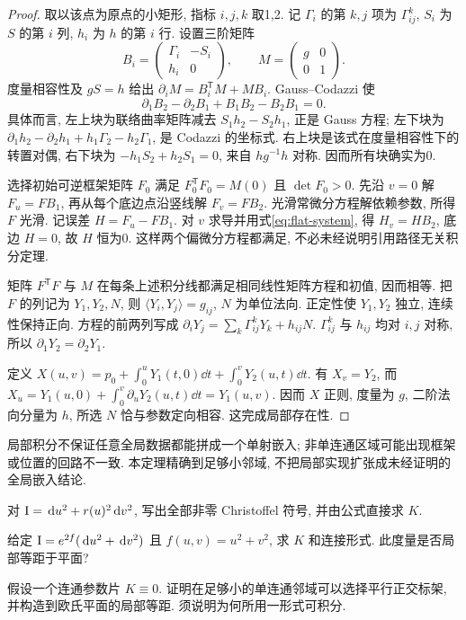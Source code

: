 \begin{proof}
取以该点为原点的小矩形, 指标 $i,j,k$ 取1,2. 记 $\Gamma_i$ 的第 $k,j$ 项为 $\Gamma^k_{ij}$, $S_i$ 为 $S$ 的第 $i$ 列, $h_i$ 为 $h$ 的第 $i$ 行. 设置三阶矩阵
\[
 B_i=\begin{pmatrix}\Gamma_i&-S_i\\h_i&0\end{pmatrix},\qquad
 M=\begin{pmatrix}g&0\\0&1\end{pmatrix}.
\]
度量相容性及 $gS=h$ 给出 $\partial_iM=B_i^{\mathsf T}M+MB_i$. Gauss--Codazzi 使
\begin{equation}\label{eq:flat-system}
 \partial_1B_2-\partial_2B_1+B_1B_2-B_2B_1=0.
\end{equation}
具体而言, 左上块为联络曲率矩阵减去 $S_1h_2-S_2h_1$, 正是 Gauss 方程; 左下块为 $\partial_1h_2-\partial_2h_1+h_1\Gamma_2-h_2\Gamma_1$, 是 Codazzi 的坐标式. 右上块是该式在度量相容性下的转置对偶, 右下块为 $-h_1S_2+h_2S_1=0$, 来自 $hg^{-1}h$ 对称. 因而所有块确实为0.

选择初始可逆框架矩阵 $F_0$ 满足 $F_0^{\mathsf T}F_0=M(0)$ 且 $\det F_0>0$. 先沿 $v=0$ 解 $F_u=FB_1$, 再从每个底边点沿竖线解 $F_v=FB_2$. 光滑常微分方程解依赖参数, 所得 $F$ 光滑. 记误差 $H=F_u-FB_1$. 对 $v$ 求导并用式\eqref{eq:flat-system}, 得 $H_v=HB_2$, 底边 $H=0$, 故 $H$ 恒为0. 这样两个偏微分方程都满足, 不必未经说明引用路径无关积分定理.

矩阵 $F^{\mathsf T}F$ 与 $M$ 在每条上述积分线都满足相同线性矩阵方程和初值, 因而相等. 把 $F$ 的列记为 $Y_1,Y_2,N$, 则 $\langle Y_i,Y_j\rangle=g_{ij}$, $N$ 为单位法向. 正定性使 $Y_1,Y_2$ 独立, 连续性保持正向. 方程的前两列写成 $\partial_iY_j=\sum_k\Gamma^k_{ij}Y_k+h_{ij}N$. $\Gamma^k_{ij}$ 与 $h_{ij}$ 均对 $i,j$ 对称, 所以 $\partial_1Y_2=\partial_2Y_1$.

定义 $X(u,v)=p_0+\int_0^uY_1(t,0)\dd t+\int_0^vY_2(u,t)\dd t$. 有 $X_v=Y_2$, 而 $X_u=Y_1(u,0)+\int_0^v\partial_uY_2(u,t)\dd t=Y_1(u,v)$. 因而 $X$ 正则, 度量为 $g$, 二阶法向分量为 $h$, 所选 $N$ 恰与参数定向相容. 这完成局部存在性.
\end{proof}
局部积分不保证任意全局数据都能拼成一个单射嵌入; 非单连通区域可能出现框架或位置的回路不一致. 本定理精确到足够小邻域, 不把局部实现扩张成未经证明的全局嵌入结论.
\begin{exercise}\label{ex:7a}
对 $\mathrm{I}=\,\mathrm d u^2+r(u)^2\,\mathrm d v^2$, 写出全部非零 Christoffel 符号, 并由公式直接求 $K$.
\end{exercise}
\begin{exercise}\label{ex:7b}
给定 $\mathrm{I}=e^{2f}(\,\mathrm d u^2+\,\mathrm d v^2)$ 且 $f(u,v)=u^2+v^2$, 求 $K$ 和连接形式. 此度量是否局部等距于平面?
\end{exercise}
\begin{exercise}\label{ex:7c}
假设一个连通参数片 $K\equiv0$. 证明在足够小的单连通邻域可以选择平行正交标架, 并构造到欧氏平面的局部等距. 须说明为何所用一形式可积分.
\end{exercise}
